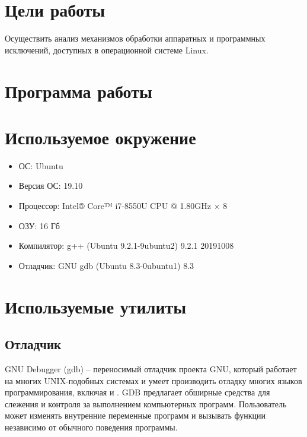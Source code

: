 





\tableofcontents
\newpage

\section{Цели работы}

Осуществить анализ механизмов обработки аппаратных и программных исключений, доступных в операционной системе Linux.

\section{Программа работы}



\section{Используемое окружение}

\begin{itemize}
	\item ОС: Ubuntu
	\item Версия ОС: 19.10
	\item Процессор: Intel® Core™ i7-8550U CPU @ 1.80GHz × 8
	\item ОЗУ: 16 Гб
	\item Компилятор: g++ (Ubuntu 9.2.1-9ubuntu2) 9.2.1 20191008
	\item Отладчик: GNU gdb (Ubuntu 8.3-0ubuntu1) 8.3
\end{itemize}

\section{Используемые утилиты}

\subsection{Отладчик }

GNU Debugger (gdb) -- переносимый отладчик проекта GNU, который работает на многих UNIX-подобных системах и умеет производить отладку многих языков программирования, включая  и . GDB предлагает обширные средства для слежения и контроля за выполнением компьютерных программ. Пользователь может изменять внутренние переменные программ и вызывать функции независимо от обычного поведения программы.

